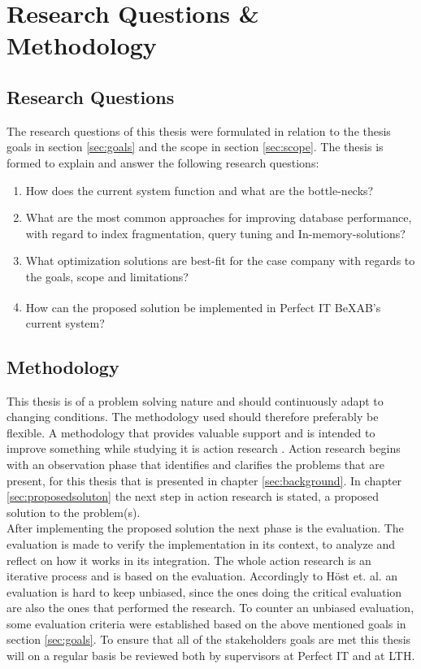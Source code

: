 \documentclass{cslthse-msc}
\newcommand{\bex}{BeX\textsuperscript{\textregistered}}
\begin{document}
\chapter{Research Questions \& Methodology}\label{chap:3}

\section{Research Questions}
The research questions of this thesis were formulated in relation to the thesis goals in section \ref{sec:goals} and the scope in section \ref{sec:scope}. The thesis is formed to explain and answer the following research questions:
\begin{enumerate}
\item	How does the current system function and what are the bottle-necks?
\item 	What are the most common approaches for improving database performance, with regard to index fragmentation, query tuning and In-memory-solutions?
\item	What optimization solutions are best-fit for the case company with regards to the goals, scope and limitations?	
\item	How can the proposed solution be implemented in Perfect IT \bex AB's current system?
\end{enumerate}

\section{Methodology}
This thesis is of a problem solving nature and should continuously adapt to changing conditions. The methodology used should therefore preferably be flexible. A methodology that provides valuable support and is intended to improve something while studying it is action research    \cite{robson}. Action research begins with an observation phase that identifies and clarifies the problems that are present, for this thesis that is presented in chapter \ref{sec:background}. In chapter \ref{sec:proposedsoluton} the next step in action research is stated, a proposed solution to the problem(s).\\

After implementing the proposed solution the next phase is the evaluation. The evaluation is made to verify the implementation in its context, to analyze and reflect on how it works in its integration. The whole action research is an iterative process and is based on the evaluation. Accordingly to Höst et. al.    \cite{regnell} an evaluation is hard to keep unbiased, since the ones doing the critical evaluation are also the ones that performed the research. To counter an unbiased evaluation, some evaluation criteria were established based on the above mentioned goals in section \ref{sec:goals}. To ensure that all of the stakeholders goals are met this thesis will on a regular basis be reviewed both by supervisors at Perfect IT and at LTH.
\end{document}
